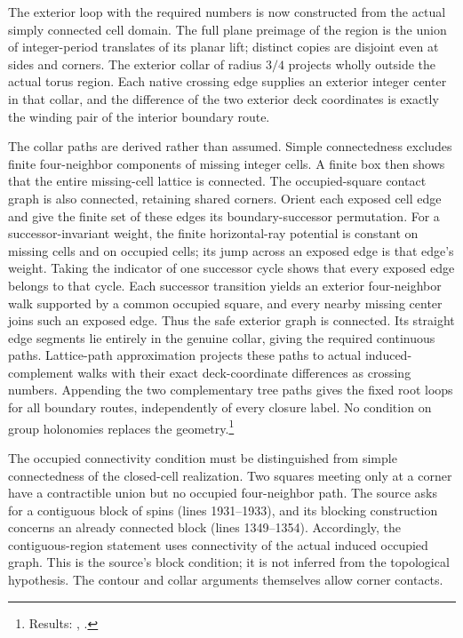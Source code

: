 \documentclass{article}
\begin{document}
The exterior loop with the required numbers is now constructed from the
actual simply connected cell domain. The full plane preimage of the region
is the union of integer-period translates of its planar lift; distinct copies
are disjoint even at sides and corners. The exterior collar of radius $3/4$
projects wholly outside the actual torus region. Each native crossing edge
supplies an exterior integer center in that collar, and the difference of
the two exterior deck coordinates is exactly the winding pair of the
interior boundary route.

The collar paths are derived rather than assumed. Simple connectedness
excludes finite four-neighbor components of missing integer cells. A finite
box then shows that the entire missing-cell lattice is connected. The
occupied-square contact graph is also connected, retaining shared corners.
Orient each exposed cell edge and give the finite set of these edges its
boundary-successor permutation. For a successor-invariant weight, the finite
horizontal-ray potential is constant on missing cells and on occupied cells;
its jump across an exposed edge is that edge's weight. Taking the indicator
of one successor cycle shows that every exposed edge belongs to that cycle.
Each successor transition yields an exterior four-neighbor walk supported
by a common occupied square, and every nearby missing center joins such an
exposed edge. Thus the safe exterior graph is connected. Its straight edge
segments lie entirely in the genuine collar, giving the required continuous
paths. Lattice-path approximation projects these paths to actual
induced-complement walks with their exact deck-coordinate differences as
crossing numbers. Appending the two complementary tree paths gives the
fixed root loops for all boundary routes, independently of every
closure label. No condition on group holonomies replaces the
geometry.\footnote{Results:
    ,
    .}

The occupied connectivity condition must be distinguished from simple
connectedness of the closed-cell realization. Two squares meeting only at
a corner have a contractible union but no occupied four-neighbor path.
The source asks for a contiguous block of spins (lines 1931--1933), and its
blocking construction concerns an already connected block (lines 1349--1354).
Accordingly, the contiguous-region statement uses connectivity of the
actual induced occupied graph. This is the source's block condition;
it is not inferred from the topological hypothesis. The contour and collar
arguments themselves allow corner contacts.
\end{document}

